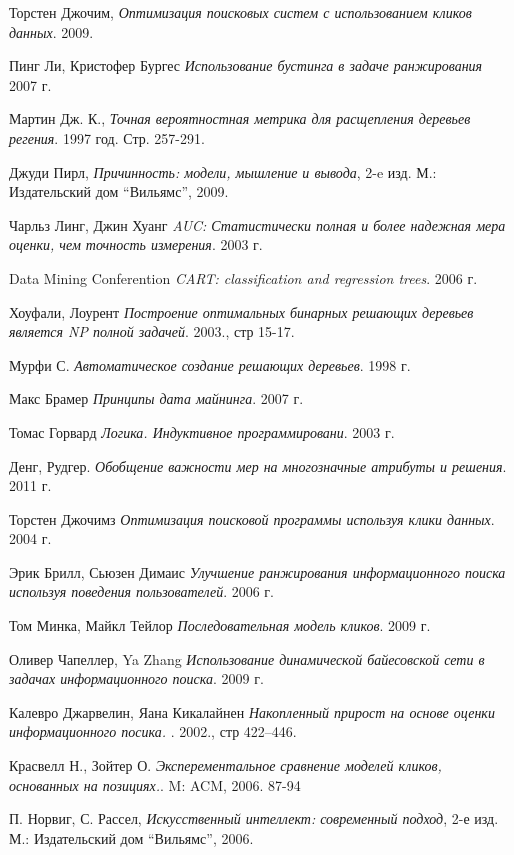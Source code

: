 \begin{thebibliography}{99}

  Торстен Джочим,
  \emph{Оптимизация поисковых систем с использованием кликов данных}.
  2009.

 Пинг Ли, Кристофер Бургес
  \emph{Использование бустинга в задаче ранжирования}
  2007 г.

  Мартин Дж. К.,
  \emph{Точная вероятностная метрика для расщепления деревьев регения}.
  1997 год. Стр. 257-291.

  Джуди Пирл,
  \emph{Причинность: модели, мышление и вывода}, 2-e изд.
  М.: Издательский дом ``Вильямс'',
  2009.

  Чарльз Линг, Джин Хуанг
  \emph{AUC: Статистически полная и более надежная мера оценки, чем точность измерения}.
  2003 г.

  Data Mining Conferention
  \emph{CART: classification and regression trees}.
  2006 г.

  Хоуфали, Лоурент
  \emph{Построение оптимальных бинарных решающих деревьев является NP полной задачей}.
  2003., стр 15-17.

  Мурфи С.
  \emph{Автоматическое создание решающих деревьев}.
  1998 г.

  Макс Брамер
  \emph{Принципы дата майнинга}.
  2007 г.

  Томас Горвард
  \emph{Логика. Индуктивное программировани}.
  2003 г.

  Денг, Рудгер.
  \emph{Обобщение важности мер на многозначные атрибуты и решения}.
  2011 г.

  Торстен Джочимз
  \emph{Оптимизация поисковой программы используя клики данных}.
  2004 г.

  Эрик Брилл, Сьюзен Димаис
  \emph{Улучшение ранжирования информационного поиска используя поведения пользователей}.
  2006 г.

  Том Минка, Майкл Тейлор
  \emph{Последовательная модель кликов}.
  2009 г. 

  Оливер Чапеллер, Ya Zhang
  \emph{Использование динамической байесовской сети в задачах информационного поиска}.
  2009 г.

  Калевро Джарвелин, Яана Кикалайнен
  \emph{Накопленный прирост на основе оценки информационного посика. }.
  2002., стр 422–446.

  Красвелл Н., Зойтер О.
  \emph{Эксперементальное сравнение моделей кликов, основанных на позициях.}.
  M: ACM, 2006. 87-94

  П. Норвиг, С. Рассел,
  \emph{Искусственный интеллект: современный подход}, 2-е изд.
  М.: Издательский дом ``Вильямс'',
  2006.

\end{thebibliography}
